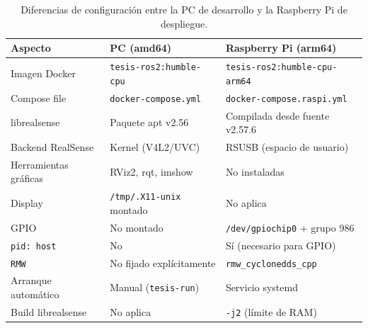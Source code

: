 \begin{table}[H]
\centering
\begin{tabular}{lll}
\toprule
\textbf{Aspecto} & \textbf{PC (amd64)} & \textbf{Raspberry Pi (arm64)} \\
\midrule
Imagen Docker         & \texttt{tesis-ros2:humble-cpu}       & \texttt{tesis-ros2:humble-cpu-arm64} \\
Compose file          & \texttt{docker-compose.yml}           & \texttt{docker-compose.raspi.yml}    \\
librealsense          & Paquete apt v2.56                     & Compilada desde fuente v2.57.6       \\
Backend RealSense     & Kernel (V4L2/UVC)                     & RSUSB (espacio de usuario)           \\
Herramientas gráficas & RViz2, rqt, imshow                   & No instaladas                        \\
Display               & \texttt{/tmp/.X11-unix} montado       & No aplica                            \\
GPIO                  & No montado                            & \texttt{/dev/gpiochip0} + grupo 986  \\
\texttt{pid: host}    & No                                    & Sí (necesario para GPIO)             \\
\texttt{RMW}          & No fijado explícitamente              & \texttt{rmw\_cyclonedds\_cpp}        \\
Arranque automático   & Manual (\texttt{tesis-run})           & Servicio systemd                     \\
Build librealsense    & No aplica                             & \texttt{-j2} (límite de RAM)         \\
\bottomrule
\end{tabular}
\caption{Diferencias de configuración entre la PC de desarrollo y la
  Raspberry Pi de despliegue.}
\label{tab:docker-pc-vs-raspi}
\end{table}
